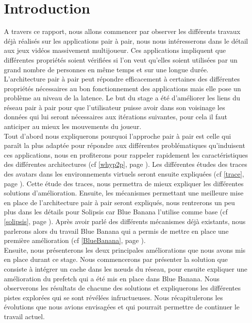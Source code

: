 \section{Introduction}
	A travers ce rapport, nous allons commencer par observer les différents travaux déjà réalisés sur les applications pair à pair, nous nous intéresserons dans le détail aux jeux vidéos massivement multijoueur. Ces applications impliquent que différentes propriétés soient vérifiées si l'on veut qu'elles soient utilisées par un grand nombre de personnes en même temps et sur une longue durée. L'architecture pair à pair peut répondre efficacement à certaines des différentes propriétés nécessaires au bon fonctionnement des applications mais elle pose un problème au niveau de la latence. Le but du stage a été d'améliorer les liens du réseau pair à pair pour que l'utilisateur puisse avoir dans son voisinage les données qui lui seront nécessaires aux itérations suivantes, pour cela il faut anticiper au mieux les mouvements du joueur.\\

	Tout d'abord nous expliquerons pourquoi l'approche pair à pair est celle qui paraît la plus adaptée pour répondre aux différentes problématiques qu'induisent ces applications, nous en profiterons pour rappeler rapidement les caractéristiques des différentes architectures (cf \ref{whyp2p}, page \pageref{whyp2p}). Les différentes études des traces des avatars dans les environnements virtuels seront ensuite expliquées (cf \ref{trace}, page \pageref{trace}). Cette étude des traces, nous permettra de mieux expliquer les différentes solutions d'amélioration. Ensuite, les mécanismes permettant une meilleure mise en place de l'architecture pair à pair seront expliqués, nous rentrerons un peu plus dans les détails pour Solipsis car Blue Banana l'utilise comme base (cf \ref{solipsis}, page \pageref{solipsis}). Après avoir parlé des différents mécanismes déjà existants, nous parlerons alors du travail Blue Banana qui a permis de mettre en place une première amélioration (cf \ref{BlueBanana}, page \pageref{BlueBanana}). \\
	
	Ensuite, nous présenterons les deux principales améliorations que nous avons mis en place durant ce stage. Nous commencerons par présenter la solution que consiste à intégrer un cache dans les nœuds du réseau, pour ensuite expliquer une amélioration du prefetch qui a été mis en place dans Blue Banana. Nous observerons les résultats de chacune des solutions et expliquerons les différentes pistes explorées qui se sont révélées infructueuses. Nous récapitulerons les évolutions que nous avions envisagées et qui pourrait permettre de continuer le travail actuel.

